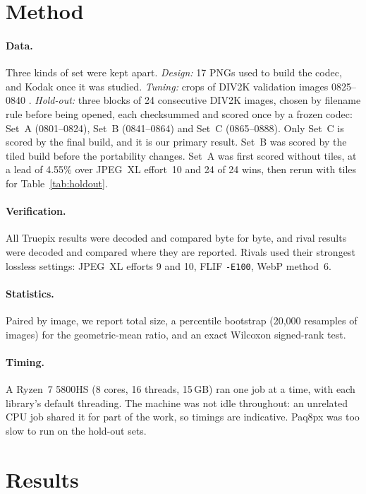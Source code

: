 \documentclass[10pt,twocolumn]{article}
\begin{document}
\section{Method}

\paragraph{Data.}
Three kinds of set were kept apart. \emph{Design:} 17 PNGs used to build the codec, and Kodak once it was studied. \emph{Tuning:} crops of DIV2K validation images 0825--0840 \cite{div2k}. \emph{Hold-out:} three blocks of 24 consecutive DIV2K images, chosen by filename rule before being opened, each checksummed and scored once by a frozen codec: Set~A (0801--0824), Set~B (0841--0864) and Set~C (0865--0888). Only Set~C is scored by the final build, and it is our primary result. Set~B was scored by the tiled build before the portability changes. Set~A was first scored without tiles, at a lead of 4.55\% over JPEG~XL effort~10 and 24 of 24 wins, then rerun with tiles for Table~\ref{tab:holdout}.

\paragraph{Verification.}
All Truepix results were decoded and compared byte for byte, and rival results were decoded and compared where they are reported. Rivals used their strongest lossless settings: JPEG~XL efforts 9 and 10, FLIF \texttt{-E100}, WebP method~6.

\paragraph{Statistics.}
Paired by image, we report total size, a percentile bootstrap (20,000 resamples of images) for the geometric-mean ratio, and an exact Wilcoxon signed-rank test.

\paragraph{Timing.}
A Ryzen~7 5800HS (8 cores, 16 threads, 15\,GB) ran one job at a time, with each library's default threading. The machine was not idle throughout: an unrelated CPU job shared it for part of the work, so timings are indicative. Paq8px was too slow to run on the hold-out sets.

\section{Results}
\label{sec:results}
\end{document}
